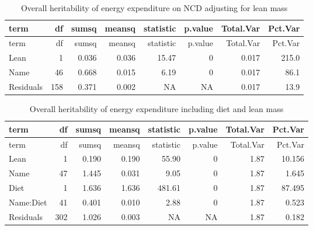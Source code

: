 \documentclass[]{article}
\newenvironment{Shaded}{\begin{snugshade}}{\end{snugshade}}
\newcommand{\DataTypeTok}[1]{\textcolor[rgb]{0.13,0.29,0.53}{#1}}
\newcommand{\DecValTok}[1]{\textcolor[rgb]{0.00,0.00,0.81}{#1}}
\newcommand{\KeywordTok}[1]{\textcolor[rgb]{0.13,0.29,0.53}{\textbf{#1}}}
\newcommand{\NormalTok}[1]{#1}
\newcommand{\OperatorTok}[1]{\textcolor[rgb]{0.81,0.36,0.00}{\textbf{#1}}}
\newcommand{\StringTok}[1]{\textcolor[rgb]{0.31,0.60,0.02}{#1}}
\begin{document}
\begin{longtable}[]{@{}lrrrrrrr@{}}
\caption{Overall heritability of energy expenditure on NCD adjusting for
lean mass}\tabularnewline
\toprule
term & df & sumsq & meansq & statistic & p.value & Total.Var &
Pct.Var\tabularnewline
\midrule
\endfirsthead
\toprule
term & df & sumsq & meansq & statistic & p.value & Total.Var &
Pct.Var\tabularnewline
\midrule
\endhead
Lean & 1 & 0.036 & 0.036 & 15.47 & 0 & 0.017 & 215.0\tabularnewline
Name & 46 & 0.668 & 0.015 & 6.19 & 0 & 0.017 & 86.1\tabularnewline
Residuals & 158 & 0.371 & 0.002 & NA & NA & 0.017 & 13.9\tabularnewline
\bottomrule
\end{longtable}

\begin{Shaded}
\end{Shaded}

\begin{longtable}[]{@{}lrrrrrrr@{}}
\caption{Overall heritability of energy expenditure including diet and
lean mass}\tabularnewline
\toprule
term & df & sumsq & meansq & statistic & p.value & Total.Var &
Pct.Var\tabularnewline
\midrule
\endfirsthead
\toprule
term & df & sumsq & meansq & statistic & p.value & Total.Var &
Pct.Var\tabularnewline
\midrule
\endhead
Lean & 1 & 0.190 & 0.190 & 55.90 & 0 & 1.87 & 10.156\tabularnewline
Name & 47 & 1.445 & 0.031 & 9.05 & 0 & 1.87 & 1.645\tabularnewline
Diet & 1 & 1.636 & 1.636 & 481.61 & 0 & 1.87 & 87.495\tabularnewline
Name:Diet & 41 & 0.401 & 0.010 & 2.88 & 0 & 1.87 & 0.523\tabularnewline
Residuals & 302 & 1.026 & 0.003 & NA & NA & 1.87 & 0.182\tabularnewline
\bottomrule
\end{longtable}
\end{document}
